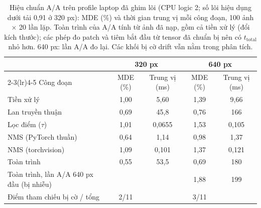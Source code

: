 \begin{table}[t]
\centering\small
\caption{Hiệu chuẩn A/A trên profile laptop đã ghim lõi (CPU logic 2; số lõi hiệu dụng dưới tải 0,91 ở 320 px): MDE (\%) và thời gian trung vị mỗi công đoạn, 100 ảnh $\times$ 20 lần lặp. Toàn trình của A/A tính từ ảnh đã nạp, gồm cả tiền xử lý (đổi kích thước); các phép đo patch và tiêm bắt đầu từ tensor đã chuẩn bị nên có $t_{\mathrm{total}}$ nhỏ hơn. 640 px: lần A/A đo lại. Các khối bị cờ drift vẫn nằm trong phân tích.}
\label{tab:aa}
\begin{tabular}{@{}lcccc@{}}
\toprule
 & \multicolumn{2}{c}{320 px} & \multicolumn{2}{c}{640 px} \\
\cmidrule(lr){2-3}\cmidrule(lr){4-5}
Công đoạn & MDE (\%) & Trung vị (ms) & MDE (\%) & Trung vị (ms) \\
\midrule
Tiền xử lý & 1,00 & 5,60 & 1,39 & 9,66 \\
Lan truyền thuận & 0,69 & 45,8 & 0,76 & 166 \\
Lọc điểm ($\tau$) & 1,01 & 0,0655 & 1,53 & 0,105 \\
NMS (PyTorch thuần) & 0,64 & 1,14 & 0,98 & 1,37 \\
NMS (torchvision) & 1,09 & 0,101 & 1,37 & 0,121 \\
Toàn trình & 0,55 & 53,5 & 0,69 & 180 \\
Toàn trình, lần A/A 640 px đầu (bị nhiễu) & & & 1,88 & 199 \\
Điểm tham chiếu bị cờ / tổng & 2/11 & & 3/11 & \\
\bottomrule
\end{tabular}
\end{table}
